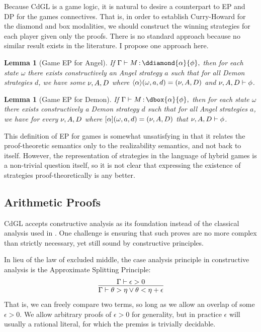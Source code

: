 \documentclass[12pt]{cmuthesis}
\newtheorem{lemma}[theorem]{Lemma}
\theoremstyle{definition}
\theoremstyle{remark}
\newcommand{\CdGL}{\textsf{CdGL}\xspace}
\begin{document}
Because \CdGL is a game logic, it is natural to desire a counterpart to EP and DP for the games connectives.
That is, in order to establish Curry-Howard for the diamond and box modalities, we should construct the winning strategies for each player given only the proofs.
There is no standard approach because no similar result exists in the literature.
I propose one approach here.
\begin{lemma}[Game EP for Angel]
If $\proves{\Gamma}{M}{\ddiamond{\alpha}{\phi}},$ then for each state $\omega$ there exists constructively an Angel strategy $a$ such that for all Demon strategies $d$,
we have some $\nu,A,D$ where $\langle{\alpha}\rangle(\omega,a,d)=(\nu,A,D)$ and $\nu,A,D \vdash \phi$.
\end{lemma}
\begin{lemma}[Game EP for Demon]
If $\proves{\Gamma}{M}{\dbox{\alpha}{\phi}},$ then for each state $\omega$ there exists constructively a Demon strategy $d$ such that for all Angel strategies $a$,
we have for every $\nu,A,D$ where $[{\alpha}](\omega,a,d)=(\nu,A,D)$ that $\nu,A,D \vdash \phi$.
\end{lemma}
This definition of EP for games is somewhat unsatisfying in that it relates the proof-theoretic semantics only to the realizability semantics, and not back to itself.
However, the representation of strategies in the language of hybrid games is a non-trivial question itself, so it is not clear that expressing the existence of strategies proof-theoretically is any better.

\subsection{Arithmetic Proofs}
\CdGL accepts constructive analysis as its foundation instead of the classical analysis used in \dGL.
One challenge is ensuring that such proves are no more complex than strictly necessary, yet still sound by constructive principles.

In lieu of the law of excluded middle, the case analysis principle in constructive analysis is the Approximate Splitting Principle:
\[\infer{\Gamma \vdash \theta > \eta \lor \theta < \eta + \epsilon}{\Gamma \vdash \epsilon > 0}\]
That is, we can freely compare two terms, so long as we allow an overlap of some $\epsilon > 0$.
We allow arbitrary proofs of $\epsilon > 0$ for generality, but in practice $\epsilon$ will usually a rational literal, for which the premiss is trivially decidable.
\end{document}
